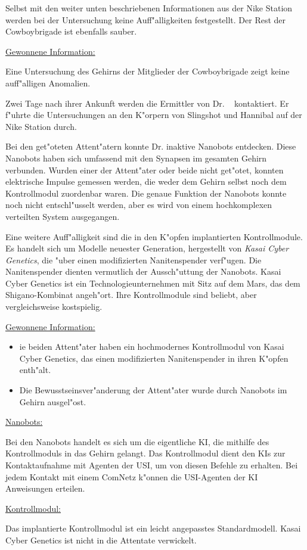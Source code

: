Selbst mit den weiter unten beschriebenen Informationen aus der Nike Station werden bei der Untersuchung keine Auff"alligkeiten festgestellt. Der Rest der Cowboybrigade ist ebenfalls sauber.

\begin{remarks}
	\underline{Gewonnene Information:}
	
	Eine Untersuchung des Gehirns der Mitglieder der Cowboybrigade zeigt keine auff"alligen Anomalien.
\end{remarks}


Zwei Tage nach ihrer Ankunft werden die Ermittler von Dr. ~  kontaktiert.  Er f"uhrte die Untersuchungen an den K"orpern von Slingshot und Hannibal auf der Nike Station durch.

Bei den get"oteten Attent"atern konnte Dr.   inaktive Nanobots entdecken. Diese Nanobots haben sich umfassend mit den Synapsen im gesamten Gehirn verbunden. Wurden einer der Attent"ater oder beide nicht get"otet, konnten elektrische Impulse gemessen werden, die weder dem Gehirn selbst noch dem Kontrollmodul zuordenbar waren. Die genaue Funktion der Nanobots konnte noch nicht entschl"usselt werden, aber es wird von einem hochkomplexen verteilten System ausgegangen.

Eine weitere Auff"alligkeit sind die in den K"opfen implantierten Kontrollmodule. Es handelt sich um Modelle neuester Generation, hergestellt von \emph{Kasai Cyber Genetics}, die "uber einen modifizierten Nanitenspender verf"ugen. Die Nanitenspender dienten vermutlich der Aussch"uttung der Nanobots. Kasai Cyber Genetics ist ein Technologieunternehmen mit Sitz auf dem Mars, das dem Shigano-Kombinat angeh"ort. Ihre Kontrollmodule sind beliebt, aber vergleichsweise kostspielig.
\vfill

\begin{remarks}
	\underline{Gewonnene Information:}
	
	\begin{itemize}
		\item ie beiden Attent"ater haben ein hochmodernes Kontrollmodul von Kasai Cyber Genetics, das einen modifizierten Nanitenspender in 
			ihren K"opfen enth"alt.
		\item Die Bewusstseinsver"anderung der Attent"ater wurde durch Nanobots im Gehirn ausgel"ost.
	\end{itemize}
	
	\underline{Nanobots:}

	Bei den Nanobots handelt es sich um die eigentliche KI, die mithilfe des Kontrollmoduls in das Gehirn gelangt. Das Kontrollmodul dient den KIs zur Kontaktaufnahme mit Agenten der USI, um von diesen Befehle zu erhalten. Bei jedem Kontakt mit einem ComNetz k"onnen die USI-Agenten der KI Anweisungen erteilen.

	\underline{Kontrollmodul:}

	Das implantierte Kontrollmodul ist ein leicht angepasstes Standardmodell. Kasai Cyber Genetics ist nicht in die Attentate verwickelt.
\end{remarks}

